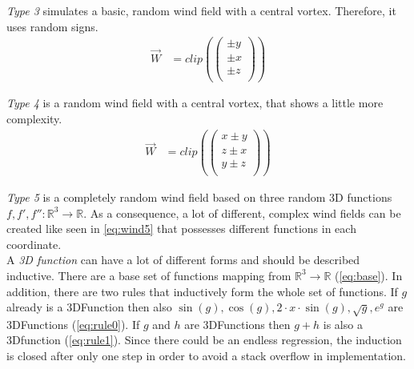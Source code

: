 \emph{Type 3} simulates a basic, random wind field with a central vortex. Therefore, it uses random signs.
\begin{align}
	\overrightarrow{W} &= clip(\left(
	\begin{array}{c}
		\pm y\\
		\pm x\\
		\pm z\\
	\end{array}
	\right))
\end{align}
\newline

\emph{Type 4} is a random wind field with a central vortex, that shows a little more complexity.
\begin{align}
	\overrightarrow{W} &= clip(\left(
	\begin{array}{c}
		x \pm y\\
		z \pm x\\
		y \pm z\\
	\end{array}
	\right))
\end{align}
\newline

\emph{Type 5} is a completely random wind field based on three random 3D functions $f, f', f'': \mathbb{R}^3 \to \mathbb{R}$. 
As a consequence, a lot of different, complex wind fields can be created like seen in \cref{eq:wind5} that possesses different functions in each coordinate.\\

A \emph{3D function} can have a lot of different forms and should be described inductive. 
There are a base set of functions mapping from $\mathbb{R}^3 \to \mathbb{R}$ (\cref{eq:base}). 
In addition, there are two rules that inductively form the whole set of functions. 
If $g$ already is a 3DFunction then also $\sin(g), \cos(g), 2 \cdot x \cdot \sin(g), \sqrt{g}, e^g$ 
are 3DFunctions (\cref{eq:rule0}). If $g$ and $h$ are 3DFunctions then $g+h$ is also a 3Dfunction (\cref{eq:rule1}). 
Since there could be an endless regression, the induction is closed after only one step in order to avoid a stack overflow in implementation. 

